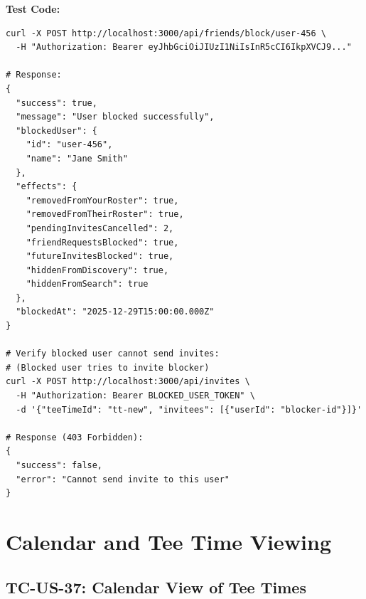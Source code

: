 \documentclass[11pt,a4paper]{article}
\begin{document}
\vspace{0.3cm}
\textbf{Test Code:}
\begin{lstlisting}
curl -X POST http://localhost:3000/api/friends/block/user-456 \
  -H "Authorization: Bearer eyJhbGciOiJIUzI1NiIsInR5cCI6IkpXVCJ9..."

# Response:
{
  "success": true,
  "message": "User blocked successfully",
  "blockedUser": {
    "id": "user-456",
    "name": "Jane Smith"
  },
  "effects": {
    "removedFromYourRoster": true,
    "removedFromTheirRoster": true,
    "pendingInvitesCancelled": 2,
    "friendRequestsBlocked": true,
    "futureInvitesBlocked": true,
    "hiddenFromDiscovery": true,
    "hiddenFromSearch": true
  },
  "blockedAt": "2025-12-29T15:00:00.000Z"
}

# Verify blocked user cannot send invites:
# (Blocked user tries to invite blocker)
curl -X POST http://localhost:3000/api/invites \
  -H "Authorization: Bearer BLOCKED_USER_TOKEN" \
  -d '{"teeTimeId": "tt-new", "invitees": [{"userId": "blocker-id"}]}'

# Response (403 Forbidden):
{
  "success": false,
  "error": "Cannot send invite to this user"
}
\end{lstlisting}

\newpage


\section{Calendar and Tee Time Viewing}

\subsection{TC-US-37: Calendar View of Tee Times}
\end{document}
